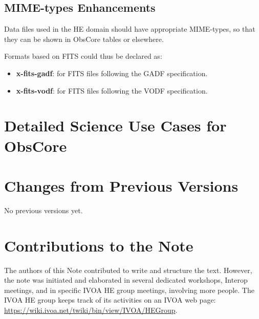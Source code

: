 \documentclass[11pt,a4paper]{ivoa}
\begin{document}
\subsection{MIME-types Enhancements}\label{sec:mimetypes}

Data files used in the \gls{HE} domain should have appropriate MIME-types, so that they can be shown in ObsCore tables or elsewhere.

Formats based on FITS could thus be declared as:

\begin{itemize}
\item {\bf x-fits-gadf}: for FITS files following the GADF specification.
\item {\bf x-fits-vodf}: for FITS files following the VODF specification.
\end{itemize}

\pagebreak
\printglossaries



\appendix


\section{Detailed Science Use Cases for ObsCore}
\label{sec:uc}




\section{Changes from Previous Versions}

No previous versions yet.


\section{Contributions to the Note}

The authors of this Note contributed to write and structure the text. However, the note was initiated and elaborated in several dedicated workshops, Interop meetings,  and in specific \gls{IVOA} \gls{HE} group meetings, involving more people. The \gls{IVOA} \gls{HE} group keeps track of its activities on an \gls{IVOA} web page: \url{https://wiki.ivoa.net/twiki/bin/view/IVOA/HEGroup}.
\end{document}
